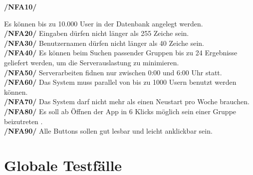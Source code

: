 \documentclass[a4paper]{scrreprt}
\begin{document}
\begin{addmargin}[25pt]{0pt} 

\hypertarget{nfa10}{\textbf{/NFA10/}} Es können bis zu 10.000 User in der Datenbank angelegt werden.\\
\hypertarget{nfa20}{\textbf{/NFA20/}} Eingaben dürfen nicht länger als 255 Zeiche sein.\\
\hypertarget{nfa30}{\textbf{/NFA30/}} Benutzernamen dürfen nicht länger als 40 Zeiche sein.\\
\hypertarget{nfa40}{\textbf{/NFA40/}} Es können beim Suchen passender Gruppen bis zu 24 Ergebnisse geliefert werden, um die Serverauslastung zu minimieren.\\
\hypertarget{nfa50}{\textbf{/NFA50/}} Serverarbeiten fidnen nur zwischen 0:00 und 6:00 Uhr statt.\\
\hypertarget{nfa60}{\textbf{/NFA60/}} Das System muss parallel von bis zu 1000 Usern benutzt werden können.\\
\hypertarget{nfa70}{\textbf{/NFA70/}} Das System darf nicht mehr als einen Neustart pro Woche brauchen.\\
\hypertarget{nfa80}{\textbf{/NFA80/}} Es soll ab Öffnen der App in 6 Klicks möglich sein einer Gruppe beizutreten .\\
\hypertarget{nfa90}{\textbf{/NFA90/}} Alle Buttons sollen gut lesbar und leicht anklickbar sein.\\

\end{addmargin}


\chapter{Globale Testfälle}
\end{document}
